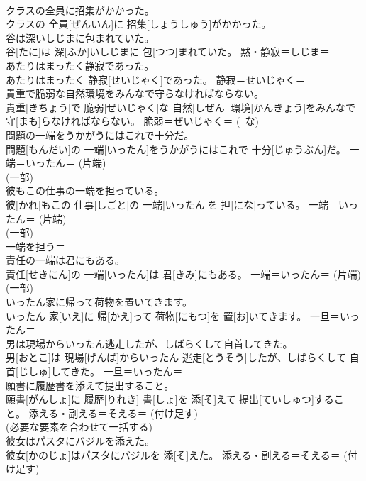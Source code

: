 \documentclass[8pt]{extreport}
\begin{document}
\begin{CJK}{UTF8}{min}
\\	クラスの全員に招集がかかった。	
\\	クラスの 全員[ぜんいん]に 招集[しょうしゅう]がかかった。	
\\	谷は深いしじまに包まれていた。	
\\	谷[たに]は 深[ふか]いしじまに 包[つつ]まれていた。	黙・静寂＝しじま＝ 
\\	あたりはまったく静寂であった。	
\\	あたりはまったく 静寂[せいじゃく]であった。	静寂＝せいじゃく＝ 
\\	貴重で脆弱な自然環境をみんなで守らなければならない。	
\\	貴重[きちょう]で 脆弱[ぜいじゃく]な 自然[しぜん] 環境[かんきょう]をみんなで 守[まも]らなければならない。	脆弱＝ぜいじゃく＝ (~な) 
\\	問題の一端をうかがうにはこれで十分だ。	
\\	問題[もんだい]の 一端[いったん]をうかがうにはこれで 十分[じゅうぶん]だ。	一端＝いったん＝ (片端) 
\\	(一部) 
\\	彼もこの仕事の一端を担っている。	
\\	彼[かれ]もこの 仕事[しごと]の 一端[いったん]を 担[にな]っている。	一端＝いったん＝ (片端) 
\\	(一部) 
\\	一端を担う＝ 
\\	責任の一端は君にもある。	
\\	責任[せきにん]の 一端[いったん]は 君[きみ]にもある。	一端＝いったん＝ (片端) 
\\	(一部) 
\\	いったん家に帰って荷物を置いてきます。	
\\	いったん 家[いえ]に 帰[かえ]って 荷物[にもつ]を 置[お]いてきます。	一旦＝いったん＝ 
\\	男は現場からいったん逃走したが、しばらくして自首してきた。	
\\	男[おとこ]は 現場[げんば]からいったん 逃走[とうそう]したが、しばらくして 自首[じしゅ]してきた。	一旦＝いったん＝ 
\\	願書に履歴書を添えて提出すること。	
\\	願書[がんしょ]に 履歴[りれき] 書[しょ]を 添[そ]えて 提出[ていしゅつ]すること。	添える・副える＝そえる＝ (付け足す) 
\\	(必要な要素を合わせて一括する) 
\\	彼女はパスタにバジルを添えた。	
\\	彼女[かのじょ]はパスタにバジルを 添[そ]えた。	添える・副える＝そえる＝ (付け足す) 

\end{CJK}
\end{document}
